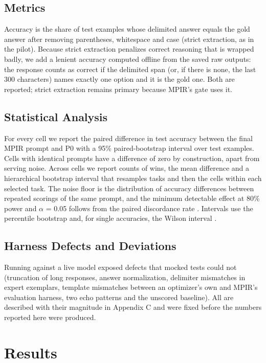 \documentclass{ieeeaccess}
\begin{document}
\subsection{Metrics}

Accuracy is the share of test examples whose delimited answer equals the gold answer after removing parentheses, whitespace and case (strict extraction, as in the pilot). Because strict extraction penalizes correct reasoning that is wrapped badly, we add a lenient accuracy computed offline from the saved raw outputs: the response counts as correct if the delimited span (or, if there is none, the last 300 characters) names exactly one option and it is the gold one. Both are reported; strict extraction remains primary because MPIR's gate uses it.

\subsection{Statistical Analysis}

For every cell we report the paired difference in test accuracy between the final MPIR prompt and P0 with a 95\% paired-bootstrap interval over test examples. Cells with identical prompts have a difference of zero by construction, apart from serving noise. Across cells we report counts of wins, the mean difference and a hierarchical bootstrap interval that resamples tasks and then the cells within each selected task. The noise floor is the distribution of accuracy differences between repeated scorings of the same prompt, and the minimum detectable effect at 80\% power and $\alpha$ = 0.05 follows from the paired discordance rate \cite{dror2018,card2020}. Intervals use the percentile bootstrap \cite{efron1979} and, for single accuracies, the Wilson interval \cite{wilson1927}.

\subsection{Harness Defects and Deviations}

Running against a live model exposed defects that mocked tests could not (truncation of long responses, answer normalization, delimiter mismatches in expert exemplars, template mismatches between an optimizer's own and MPIR's evaluation harness, two echo patterns and the unscored baseline). All are described with their magnitude in Appendix C and were fixed before the numbers reported here were produced.

\section{Results}
\end{document}
